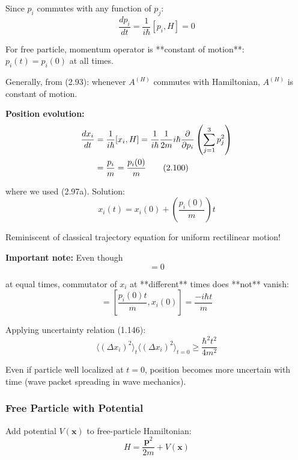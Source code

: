 \documentclass[11pt,a4paper]{article}
\begin{document}
Since $p_i$ commutes with any function of $p_j$:
\begin{equation}
\frac{dp_i}{dt} = \frac{1}{i\hbar}[p_i, H] = 0
\tag{2.99}
\end{equation}

For free particle, momentum operator is **constant of motion**: $p_i(t) = p_i(0)$ at all times.

Generally, from (2.93): whenever $A^{(H)}$ commutes with Hamiltonian, $A^{(H)}$ is constant of motion.

\textbf{Position evolution:}
\begin{align}
\frac{dx_i}{dt} &= \frac{1}{i\hbar}[x_i, H] = \frac{1}{i\hbar}\frac{1}{2m}i\hbar\frac{\partial}{\partial p_i}\left(\sum_{j=1}^3 p_j^2\right) \notag \\
&= \frac{p_i}{m} = \frac{p_i(0)}{m}
\tag{2.100}
\end{align}

where we used (2.97a). Solution:
\begin{equation}
x_i(t) = x_i(0) + \left(\frac{p_i(0)}{m}\right)t
\tag{2.101}
\end{equation}

Reminiscent of classical trajectory equation for uniform rectilinear motion!

\textbf{Important note:} Even though
\begin{equation}
[x_i(0), x_j(0)] = 0
\tag{2.102}
\end{equation}

at equal times, commutator of $x_i$ at **different** times does **not** vanish:
\begin{equation}
[x_i(t), x_i(0)] = \left[\frac{p_i(0)t}{m}, x_i(0)\right] = \frac{-i\hbar t}{m}
\tag{2.103}
\end{equation}

Applying uncertainty relation (1.146):
\begin{equation}
\langle(\Delta x_i)^2\rangle_t\langle(\Delta x_i)^2\rangle_{t=0} \geq \frac{\hbar^2 t^2}{4m^2}
\tag{2.104}
\end{equation}

Even if particle well localized at $t = 0$, position becomes more uncertain with time (wave packet spreading in wave mechanics).

\subsubsection{Free Particle with Potential}

Add potential $V(\mathbf{x})$ to free-particle Hamiltonian:
\begin{equation}
H = \frac{\mathbf{p}^2}{2m} + V(\mathbf{x})
\tag{2.105}
\end{equation}
\end{document}
